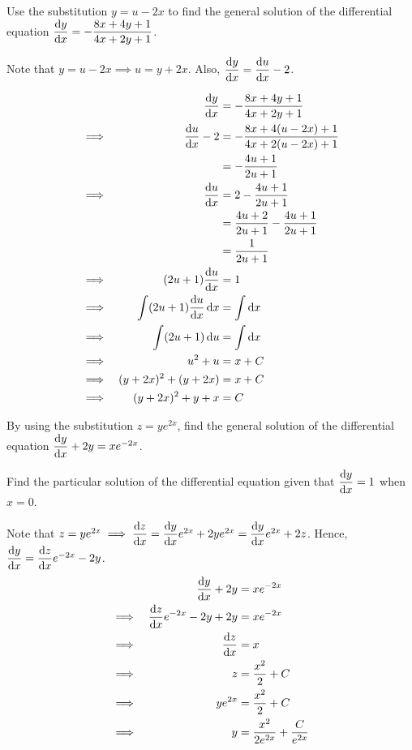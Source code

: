 \documentclass{echw}
\begin{document}
    \problem{}
        Use the substitution $y = u - 2x$ to find the general solution of the differential equation $\dfrac{\mathrm{d} y}{\mathrm{d} x} = -\dfrac{8x + 4y + 1}{4x+2y+1}$.

    \solution
        Note that $y = u - 2x \implies u = y + 2x$. Also, $\dfrac{\mathrm{d} y}{\mathrm{d} x} = \dfrac{\mathrm{d} u}{\mathrm{d} x} - 2$.

        \begin{alignat*}{2}
            && \dfrac{\mathrm{d} y}{\mathrm{d} x} &= -\dfrac{8x + 4y + 1}{4x+2y+1}\\
            \implies&& \dfrac{\mathrm{d} u}{\mathrm{d} x} - 2 &= -\dfrac{8x + 4(u - 2x) + 1}{4x+2(u - 2x)+1}\\
            && &= -\dfrac{4u + 1}{2u + 1}\\
            \implies&& \dfrac{\mathrm{d} u}{\mathrm{d} x} &= 2 - \dfrac{4u+1}{2u+1}\\
            && &= \dfrac{4u+2}{2u+1} - \dfrac{4u+1}{2u+1}\\
            && &= \dfrac1{2u+1}\\
            \implies&& (2u+1)\dfrac{\mathrm{d} u}{\mathrm{d} x} &= 1\\
            \implies&& \int (2u+1)\dfrac{\mathrm{d} u}{\mathrm{d} x} \mathop{\mathrm{d}x} &= \int \mathop{\mathrm{d}x}\\
            \implies&& \int (2u+1) \mathop{\mathrm{d}u} &= \int \mathop{\mathrm{d}x}\\
            \implies&& u^2 + u &= x + C\\
            \implies&& (y + 2x)^2 + (y + 2x) &= x + C\\
            \implies&& (y + 2x)^2 + y + x &= C
        \end{alignat*}


    \problem{}
        By using the substitution $z = ye^{2x}$, find the general solution of the differential equation $\dfrac{\mathrm{d} y}{\mathrm{d} x} + 2y = xe^{-2x}$.

        Find the particular solution of the differential equation given that $\dfrac{\mathrm{d} y}{\mathrm{d} x} = 1$ when $x = 0$.

    \solution
        Note that $z = ye^{2x} \implies \dfrac{\mathrm{d} z}{\mathrm{d} x} = \dfrac{\mathrm{d} y}{\mathrm{d} x} e^{2x} + 2y e^{2x} = \dfrac{\mathrm{d} y}{\mathrm{d} x} e^{2x} + 2z$. Hence, $\dfrac{\mathrm{d} y}{\mathrm{d} x} = \dfrac{\mathrm{d} z}{\mathrm{d} x} e^{-2x} - 2y$.
        \begin{alignat*}{2}
            && \dfrac{\mathrm{d} y}{\mathrm{d} x} + 2y &= xe^{-2x}\\
            \implies&& \dfrac{\mathrm{d} z}{\mathrm{d} x} e^{-2x} - 2y + 2y &= xe^{-2x}\\
            \implies&& \dfrac{\mathrm{d} z}{\mathrm{d} x} &= x\\
            \implies&& z &= \dfrac{x^2}{2} + C\\
            \implies&& ye^{2x} &= \dfrac{x^2}{2} + C\\
            \implies&& y &= \dfrac{x^2}{2e^{2x}} + \dfrac{C}{e^{2x}}
        \end{alignat*}
\end{document}
